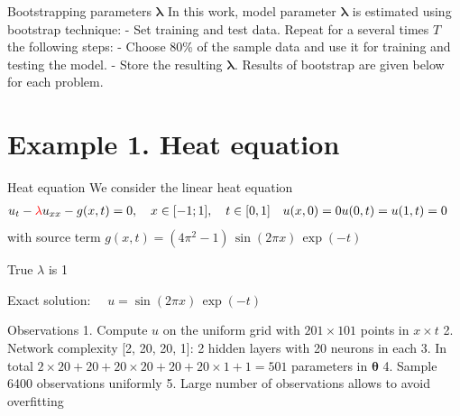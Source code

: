 \documentclass{beamer}
\def\\{}%
\renewcommand{\vec}[1]{\boldsymbol{#1}}
\newcommand{\VTheta}{\ensuremath{\vec{\theta}}}
\begin{document}
\begin{frame}{Bootstrapping parameters $\vec{\lambda}$}
    In this work, model parameter $\vec{\lambda}$ is estimated using bootstrap technique:\\
    \vspace{0.5cm}
    \quad - Set training and test data.\\
    Repeat for a several times $T$ the following steps:\\
    \quad - Choose 80\% of the sample data and use it for training and testing the model. \\
    \quad - Store the resulting $\vec{\lambda}$.\\
    \vspace{0.5cm}
    Results of bootstrap are given below for each problem.
\end{frame}




\section{Example 1. Heat equation}

\begin{frame}{Heat equation}
We consider the linear heat equation
\begin{align*}
    &u_t - {\color{red}\lambda} u_{xx} - g(x, t) = 0, \quad x\in[-1; 1], \quad t\in[0, 1] \\
    &u(x, 0) = 0 \\
    &u(0, t) = u(1, t) = 0
\end{align*}
with source term $g(x, t) = (4\pi^2 -1) \, \sin(2\pi x) \, \exp(-t)$

\vspace{0.5cm}
True $\lambda$ is 1

Exact solution: $\quad u = \sin(2\pi x) \, \exp(-t)$
\end{frame}

\begin{frame}{Observations}
1. Compute $u$ on the uniform grid with $201\times101$ points in $x\times t$\\
2. Network complexity [2, 20, 20, 1]: 2 hidden layers with 20 neurons in each\\
3. In total $2\times20 + 20 + 20\times20 + 20 + 20\times1+1=501$ parameters in $\VTheta$\\
4. Sample 6400 observations uniformly\\
5. Large number of observations allows to avoid overfitting
\end{frame}
\end{document}
